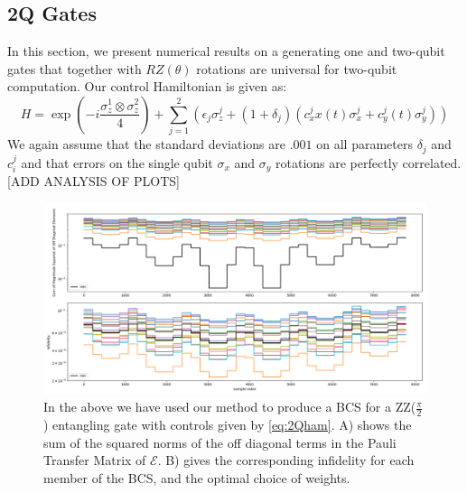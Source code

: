\documentclass[aps,nofootinbib,pra,notitlepage,twocolumn]{revtex4-1}
\begin{document}
\subsection{2Q Gates}\label{2Q Gates}
 In this section, we present numerical results on a generating one and two-qubit gates that together with $RZ(\theta)$ rotations are universal for two-qubit computation. Our control Hamiltonian is given as: 
\begin{equation} \label{eq:2Qham}
H = \exp{(-i\frac{\sigma_z^1\otimes\sigma_z^2}{4})} + \sum_{j=1}^2(\epsilon_j\sigma_z^j + (1 + \delta_j)(c_x^jx(t)\sigma_x^j + c_y^j(t)\sigma_y^j))
\end{equation}
We again assume that the standard deviations are $.001$ on all parameters $\delta_j$ and $c^j_i$ and that errors on the single qubit $\sigma_x$ and $\sigma_y$ rotations are perfectly correlated.
[ADD ANALYSIS OF PLOTS]
\begin{figure}[t]
\centering
\includegraphics[width=\textwidth]{2Q.png}
\caption{In the above we have used our method to produce a BCS for a ZZ($\frac{\pi}{2}$) entangling gate with controls given by \ref{eq:2Qham}. A) shows the sum of the squared norms of the off diagonal terms in the Pauli Transfer Matrix of $\mathcal{E}$. B) gives the corresponding infidelity for each member of the BCS, and the optimal choice of weights.}
\end{figure}
\end{document}
